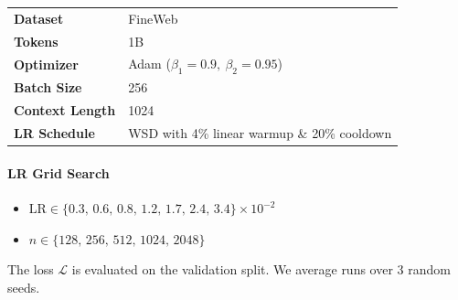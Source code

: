 \begin{table}[ht]
\centering
\small
\renewcommand{\arraystretch}{1.2}
\begin{tabular}{@{}ll@{}}
\toprule
\textbf{Dataset}       & FineWeb                                        \\ 
\addlinespace
\textbf{Tokens}        & 1B                                                   \\ 
\addlinespace
\textbf{Optimizer}     & Adam ($\beta_1=0.9,\ \beta_2=0.95$) \\

\addlinespace
\textbf{Batch Size}     & 256 \\

\addlinespace
\textbf{Context Length}     & 1024 \\

\addlinespace
\textbf{LR Schedule}   & WSD with 4\% linear warmup \& 20\% cooldown         \\ 
\bottomrule
\end{tabular}
\end{table}



\paragraph{LR Grid Search}
\begin{itemize}[nosep,leftmargin=*]
  \item \(\displaystyle \mathrm{LR} \in \{0.3,\, 0.6,\, 0.8,\, 1.2,\, 1.7,\, 2.4,\, 3.4
\}\times10^{-2}\)
  
  \vspace{2mm}
  
  \item \(n \in \{128,\,256,\,512,\,1024,\,2048\}\)
\end{itemize}
The loss \(\mathcal{L}\) is evaluated on the validation split. We average runs over 3 random seeds.

